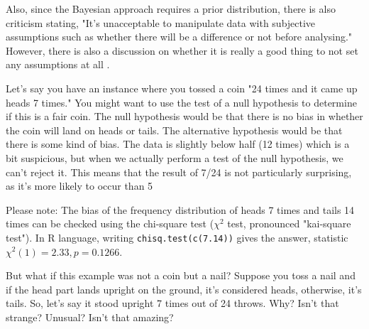 \documentclass{ltjbook}
\begin{document}
Also, since the Bayesian approach requires a prior distribution, there is also criticism stating, "It's unacceptable to manipulate data with subjective assumptions such as whether there will be a difference or not before analysing."
However, there is also a discussion on whether it is really a good thing to not set any assumptions at all \parencite{Maeda2017}.

Let's say you have an instance where you tossed a coin "24 times and it came up heads 7 times." You might want to use the test of a null hypothesis to determine if this is a fair coin. The null hypothesis would be that there is no bias in whether the coin will land on heads or tails. The alternative hypothesis would be that there is some kind of bias. The data is slightly below half (12 times) which is a bit suspicious, but when we actually perform a test of the null hypothesis, we can't reject it. This means that the result of 7/24 is not particularly surprising, as it's more likely to occur than 5%

Please note: The bias of the frequency distribution of heads 7 times and tails 14 times can be checked using the chi-square test ($\chi^2$ test, pronounced "kai-square test"). In R language, writing \texttt{chisq.test(c(7.14))} gives the answer, statistic $\chi^2(1)=2.33,p=0.1266$.

But what if this example was not a coin but a nail? Suppose you toss a nail and if the head part lands upright on the ground, it's considered heads, otherwise, it's tails. So, let's say it stood upright 7 times out of 24 throws. Why? Isn't that strange? Unusual? Isn't that amazing?
\end{document}
